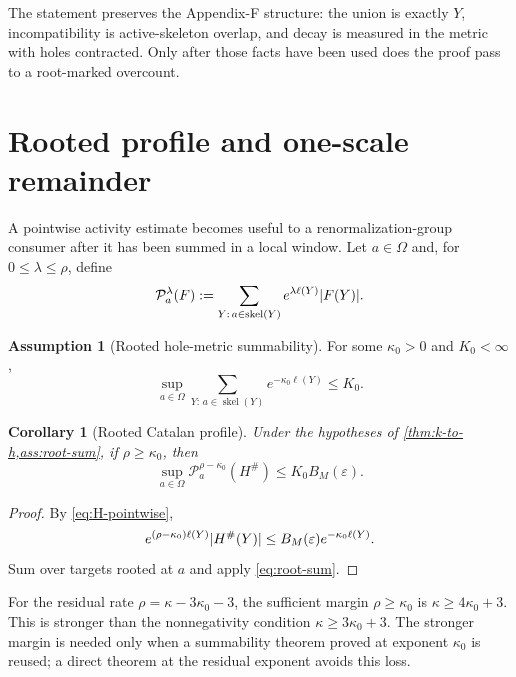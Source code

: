 \documentclass[11pt,a4paper]{article}
\newtheorem{corollary}[theorem]{Corollary}
\theoremstyle{definition}
\newtheorem{assumption}[theorem]{Assumption}
\newcommand{\skel}{\operatorname{skel}}
\newcommand{\eps}{\varepsilon}
\newcommand{\Hsharp}{H^{\#}}
\DeclarePairedDelimiter{\abs}{\lvert}{\rvert}
\begin{document}
The statement preserves the Appendix-F structure: the union is exactly $Y$,
incompatibility is active-skeleton overlap, and decay is measured in the metric with
holes contracted.  Only after those facts have been used does the proof pass to a
root-marked overcount.

\section{Rooted profile and one-scale remainder}
\label{sec:profile}

A pointwise activity estimate becomes useful to a renormalization-group consumer after
it has been summed in a local window.  Let $a\in\Omega$ and, for
$0\le\lambda\le\rho$, define
\begin{equation}
  \mathcal P_a^{\lambda}(F)
  :=\sum_{Y:\,a\in\skel(Y)}e^{\lambda\ell(Y)}\abs{F(Y)}.
  \label{eq:root-profile}
\end{equation}

\begin{assumption}[Rooted hole-metric summability]
\label{ass:root-sum}
For some $\kappa_0>0$ and $K_0<\infty$,
\begin{equation}
  \sup_{a\in\Omega}
  \sum_{Y:\,a\in\skel(Y)}e^{-\kappa_0\ell(Y)}\le K_0.
  \label{eq:root-sum}
\end{equation}
\end{assumption}

\begin{corollary}[Rooted Catalan profile]
\label{cor:rooted-profile}
Under the hypotheses of \cref{thm:k-to-h,ass:root-sum}, if $\rho\ge\kappa_0$, then
\begin{equation}
  \sup_{a\in\Omega}\mathcal P_a^{\rho-\kappa_0}(\Hsharp)
  \le K_0 B_M(\eps).
  \label{eq:rooted-profile-bound}
\end{equation}
\end{corollary}

\begin{proof}
By \eqref{eq:H-pointwise},
\[
 e^{(\rho-\kappa_0)\ell(Y)}\abs{\Hsharp(Y)}
 \le B_M(\eps)e^{-\kappa_0\ell(Y)}.
\]
Sum over targets rooted at $a$ and apply \eqref{eq:root-sum}.
\end{proof}

For the residual rate $\rho=\kappa-3\kappa_0-3$, the sufficient margin
$\rho\ge\kappa_0$ is $\kappa\ge4\kappa_0+3$.  This is stronger than the
nonnegativity condition $\kappa\ge3\kappa_0+3$.  The stronger margin is needed only
when a summability theorem proved at exponent $\kappa_0$ is reused; a direct theorem at
the residual exponent avoids this loss.
\end{document}
